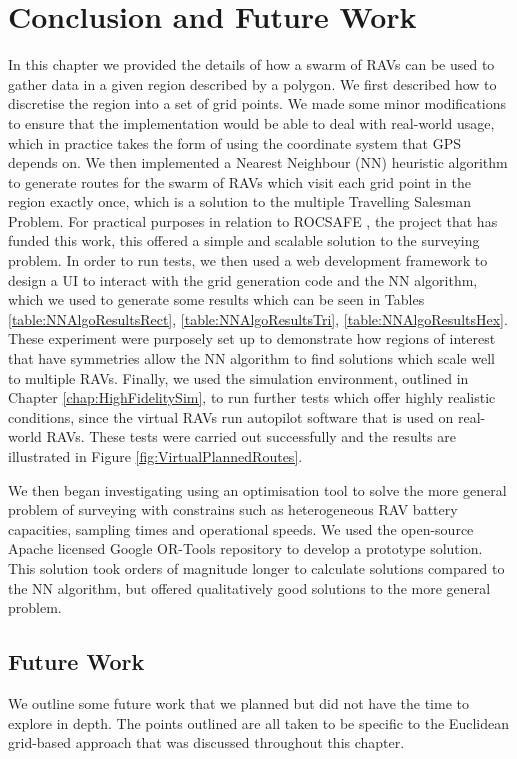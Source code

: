 \section{Conclusion and Future Work}\label{sec:SurveyingConclusionFutureWork}
In this chapter we provided the details of how a swarm of RAVs can be used to gather data in a given region described by a polygon. We first described how to discretise the region into a set of grid points. We made some minor modifications to ensure that the implementation would be able to deal with real-world usage, which in practice takes the form of using the coordinate system that GPS depends on. We then implemented a Nearest Neighbour (NN) heuristic algorithm to generate routes for the swarm of RAVs which visit each grid point in the region exactly once, which is a solution to the multiple Travelling Salesman Problem. For practical purposes in relation to ROCSAFE \cite{Bagherzadeh2017ROCSAFE:Incidents}, the project that has funded this work, this offered a simple and scalable solution to the surveying problem. In order to run tests, we then used a web development framework to design a UI to interact with the grid generation code and the NN algorithm, which we used to generate some results which can be seen in Tables \ref{table:NNAlgoResultsRect}, \ref{table:NNAlgoResultsTri}, \ref{table:NNAlgoResultsHex}. These experiment were purposely set up to demonstrate how regions of interest that have symmetries allow the NN algorithm to find solutions which scale well to multiple RAVs. %
Finally, we used the simulation environment, outlined in Chapter \ref{chap:HighFidelitySim}, to run further tests which offer highly realistic conditions, since the virtual RAVs run autopilot software that is used on real-world RAVs. These tests were carried out successfully and the results are illustrated in Figure \ref{fig:VirtualPlannedRoutes}. 

We then began investigating using an optimisation tool to solve the more general problem of surveying with constrains such as heterogeneous RAV battery capacities, sampling times and operational speeds. We used the open-source Apache licensed Google OR-Tools repository to develop a prototype solution. This solution took orders of magnitude longer to calculate solutions compared to the NN algorithm, but offered qualitatively good solutions to the more general problem.



\subsection{Future Work}
We outline some future work that we planned but did not have the time to explore in depth. The points outlined are all taken to be specific to the Euclidean grid-based approach that was discussed throughout this chapter.

